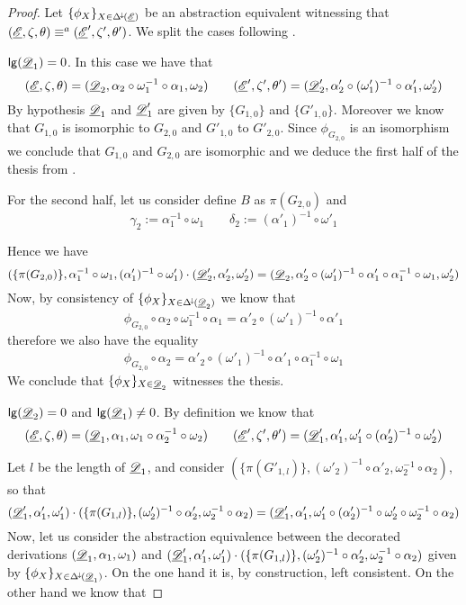 \begin{proof} Let $\{\phi_X\}_{X\in \Delta^{\hspace{-1pt}\downarrow\hspace{-1pt}}(\underline{\mathscr{E}})}$ be an abstraction equivalent witnessing that $(\underline{\mathscr{E}}, \zeta, \theta)\equiv^{a}(\underline{\mathscr{E}}', \zeta', \theta')$.	We split the cases following .
	
	\smallskip \noindent $\mathsf{lg}(\underline{\mathscr{D}}_1)=0$. In this case we have that
	\[(\underline{\mathscr{E}}, \zeta, \theta)=(\underline{\mathscr{D}}_2, \alpha_2\circ \omega^{-1}_1 \circ \alpha_1, \omega_2) \qquad (\underline{\mathscr{E}}', \zeta', \theta')=(\underline{\mathscr{D}}'_2, \alpha'_2\circ (\omega'_1)^{-1} \circ \alpha'_1, \omega'_2)\]
	By hypothesis $\underline{\mathscr{D}}_1$ and $\underline{\mathscr{D}}'_1$ are given by $\{G_{1,0}\}$ and $\{G'_{1,0}\}$. Moreover we know that $G_{1,0}$ is isomorphic to $G_{2,0}$ and  $G'_{1,0}$ to $G'_{2,0}$. Since $\phi_{G_{2,0}}$ is an isomorphism we conclude that $G_{1,0}$ and $G_{2,0}$ are isomorphic and we deduce the first half of the thesis from . 
	
	For the second half, let us consider define $B$ as $\pi(G_{2,0})$ and
	\[\gamma_2:=\alpha^{-1}_1\circ \omega_1\qquad  \delta_2:=(\alpha'_1)^{-1}\circ \omega'_1  \]
	
	Hence we have
\[
(\{\pi(G_{2,0})\}, \alpha^{-1}_1\circ \omega_1,  (\alpha'_1)^{-1}\circ \omega'_1 )\cdot(\underline{\mathscr{D}}'_2, \alpha'_2, \omega'_2)  =(\underline{\mathscr{D}}_2, \alpha'_2\circ (\omega'_1)^{-1} \circ \alpha'_1\circ \alpha_1^{-1}\circ \omega_1, \omega'_2)\]
Now, by consistency of $\{\phi_{X}\}_{X\in \Delta^{\hspace{-1pt}\downarrow\hspace{-1pt}}(\underline{\mathscr{D}}_2)}$ we know that
\[\phi_{G_{2,0}}\circ \alpha_2\circ \omega^{-1}_1\circ \alpha_1=\alpha'_2\circ (\omega'_1)^{-1} \circ \alpha'_1\]
	therefore we also have the equality
	\[\phi_{G_{2,0}}\circ \alpha_2=\alpha'_2\circ (\omega'_1)^{-1} \circ \alpha'_1 \circ \alpha^{-1}_1\circ \omega_1 \]
	We conclude that $\{\phi_X\}_{X\in \underline{\mathscr{D}}_2}$ witnesses the thesis.
	
	\smallskip \noindent $\mathsf{lg}(\underline{\mathscr{D}}_2)=0$ and $\mathsf{lg}(\underline{\mathscr{D}}_1)\neq 0$. By definition we know that
	\[(\underline{\mathscr{E}}, \zeta, \theta)=(\underline{\mathscr{D}}_1, \alpha_1, \omega_1\circ \alpha_2^{-1}\circ \omega_2) \qquad (\underline{\mathscr{E}}', \zeta', \theta')=(\underline{\mathscr{D}}'_1, \alpha'_1, \omega'_1\circ (\alpha'_2)^{-1}\circ \omega'_2)\]
	
	Let $l$ be the length of $\underline{\mathscr{D}}_1$, and consider $(\{\pi(G'_{1, l})\}, (\omega'_2)^{-1}\circ \alpha'_2, \omega^{-1}_2\circ \alpha_2)$, so that
	\[ (\underline{\mathscr{D}}'_1, \alpha'_1, \omega'_1) \cdot  (\{\pi(G_{1, l})\}, (\omega'_2)^{-1}\circ \alpha'_2, \omega^{-1}_2\circ \alpha_2)= (\underline{\mathscr{D}}'_1, \alpha'_1, \omega'_1\circ (\alpha'_2)^{-1}\circ \omega'_2 \circ \omega^{-1}_2\circ \alpha_2)\]
	Now, let us consider the abstraction equivalence between  the decorated derivations $(\underline{\mathscr{D}}_1, \alpha_1, \omega_1)$ and  $(\underline{\mathscr{D}}'_1, \alpha'_1, \omega'_1) \cdot  (\{\pi(G_{1, l})\}, (\omega'_2)^{-1}\circ \alpha'_2, \omega^{-1}_2\circ \alpha_2)$ given by $\{\phi_X\}_{X\in \Delta^{\hspace{-1pt}\downarrow\hspace{-1pt}}(\underline{\mathscr{D}}_1)}$. On the one hand it is, by construction, left consistent.  On the other hand we know that 
	 

\end{proof}
